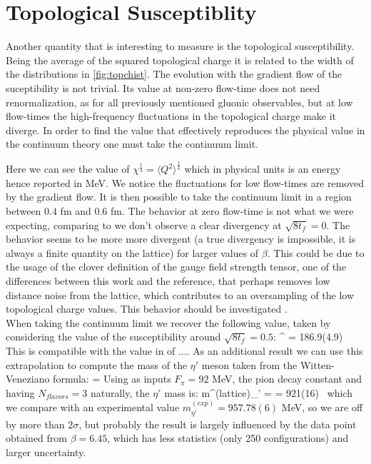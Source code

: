\section{Topological Susceptiblity}
Another quantity that is interesting to measure is the topological susceptibility. Being the average of the squared topological charge it is related to the width of the distributions in \cref{fig:topchist}. The evolution with the gradient flow of the suceptibility is not trivial. Its value at non-zero flow-time does not need renormalization, as for all previously mentioned gluonic observables, but at low flow-times the high-frequency fluctuations in the topological charge make it diverge. In order to find the value that effectively reproduces the physical value in the continuum theory one must take the continuum limit. 

Here we can see the value of $\chi^{\frac{1}{4}} = \langle Q^2 \rangle ^{\frac{1}{4}}$ which in physical units is an energy hence reported in MeV. We notice the fluctuations for low flow-times are removed by the gradient flow. It is then possible to take the continuum limit in a region between $0.4$ fm and $0.6$ fm. 
The behavior at zero flow-time is not what we were expecting, comparing to \CIT we don't observe a clear divergency at $\sqrt{8t_f} = 0$. The behavior seems to be more more divergent (a true divergency is impossible, it is always a finite quantity on the lattice) for larger values of $\beta$. This could be due to the usage of the clover definition of the gauge field strength tensor, one of the differences between this work and the reference, that perhaps removes low distance noise from the lattice, which contributes to an oversampling of the low topological charge values. This behavior should be investigated .\\
When taking the continuum limit we recover the following value, taken by considering the value of the susceptibility around $\sqrt{8t_f} = 0.5$:
\beq
    \chi^{} = 186.9(4.9)~ 
    \label{val:tops}
\eeq 
This is compatible with the value in \CIT of .... 
As an additional result we can use this extrapolation to compute the mass of the $\eta'$ meson taken from the Witten-Veneziano formula:
\beq
    \chi = 
\eeq 
Using as inputs $F_\pi = 92$ MeV, the pion decay constant and having $N_{flavors} = 3$ naturally, the $\eta'$ mass is:
\beq    
    m^{(lattice)}_{\eta'} =  = 921(16)~ 
\eeq
which we compare with an experimental value  $m^{(exp)}_{\eta'} = 957.78(6)$ MeV, so we are off by more than $2\sigma$, but probably the result is largely influenced by the data point obtained from $\beta=6.45$, which has less statistics (only 250 configurations) and larger uncertainty.